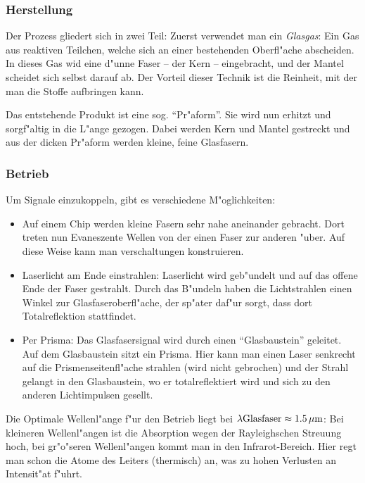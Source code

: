 \documentclass[twoside,a4paper]{book}
\newcommand{\abs}[0]{\bigskip \noindent}
\begin{document}
\subsubsection{Herstellung}
\label{kap_herstellung}

Der Prozess gliedert sich in zwei Teil: Zuerst verwendet man ein
\emph{Glasgas}: Ein Gas aus reaktiven Teilchen, welche sich an einer
bestehenden Oberfl"ache abscheiden. In dieses Gas wid eine d"unne
Faser -- der Kern -- eingebracht, und der Mantel scheidet sich selbst
darauf ab. Der Vorteil dieser Technik ist die Reinheit, mit der man
die Stoffe aufbringen kann.

Das entstehende Produkt ist eine sog. "`Pr"aform"'. Sie wird nun
erhitzt und sorgf"altig in die L"ange gezogen. Dabei werden Kern und
Mantel gestreckt und aus der dicken Pr"aform werden kleine, feine
Glasfasern.


\subsubsection{Betrieb}
\label{kap_betrieb}

Um Signale einzukoppeln, gibt es verschiedene M"oglichkeiten:
\begin{itemize}
\item Auf einem Chip werden kleine Fasern sehr nahe aneinander
   gebracht. Dort treten nun Evaneszente Wellen von der einen Faser
   zur anderen "uber. Auf diese Weise kann man verschaltungen konstruieren.
\item Laserlicht am Ende einstrahlen: Laserlicht wird geb"undelt und
   auf das offene Ende der Faser gestrahlt. Durch das B"undeln haben
   die Lichtstrahlen einen Winkel zur Glasfaseroberfl"ache, der
   sp"ater daf"ur sorgt, dass dort Totalreflektion stattfindet.
\item Per Prisma: Das Glasfasersignal wird durch einen "`Glasbaustein"'
   geleitet. Auf dem Glasbaustein sitzt ein Prisma. Hier kann man
   einen Laser senkrecht auf die Prismenseitenfl"ache strahlen (wird
   nicht gebrochen) und der Strahl gelangt in den Glasbaustein, wo er
   totalreflektiert wird und sich zu den anderen Lichtimpulsen gesellt.
\end{itemize}

\abs
Die Optimale Wellenl"ange f"ur den Betrieb liegt bei
$\lambda\text{Glasfaser} \approx \unit[1.5]{\mu m}$: Bei kleineren
Wellenl"angen ist die Absorption wegen der Rayleighschen Streuung hoch, bei gr"o"seren Wellenl"angen
kommt man in den Infrarot-Bereich. Hier regt man schon die Atome des
Leiters (thermisch) an, was zu hohen Verlusten an Intensit"at f"uhrt.
\end{document}
